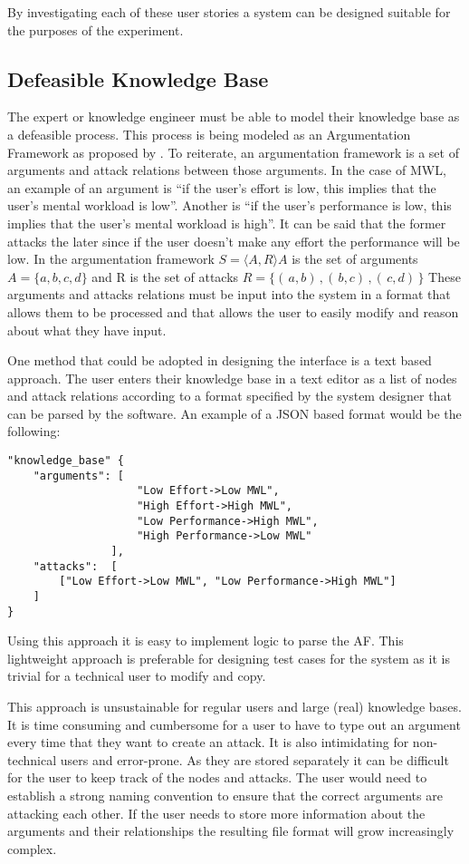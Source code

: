 By investigating each of these user stories a system can be designed suitable for the purposes of the experiment.

\subsection{Defeasible Knowledge Base}
\label{sec:def_kb}
The expert or knowledge engineer must be able to model their knowledge base as a defeasible process. This process is being modeled as an Argumentation Framework as proposed by \cite{dung1995acceptability}. To reiterate, an argumentation framework is a set of arguments and attack relations between those arguments. In the case of MWL, an example of an argument is ``if the user's effort is low, this implies that the user's mental workload is low''. Another is ``if the user's performance is low, this implies that the user's mental workload is high''. It can be said that the former attacks the later since if the user doesn't make any effort the performance will be low. In the argumentation framework $S = \langle A , R \rangle A$ is the set of arguments $A = \{ a , b , c , d \}$ and R is the set of attacks $R = \{ (\, a , b )\, , (\, b , c )\, , (\, c , d )\, \}$  These arguments and attacks relations must be input into the system in a format that allows them to be processed and that allows the user to easily modify and reason about what they have input.

One method that could be adopted in designing the interface is a text based approach. The user enters their knowledge base in a text editor as a list of nodes and attack relations according to a format specified by the system designer that can be parsed by the software. An example of a JSON based format would be the following:

\begin{lstlisting}
"knowledge_base" {
    "arguments": [
                    "Low Effort->Low MWL", 
                    "High Effort->High MWL", 
                    "Low Performance->High MWL", 
                    "High Performance->Low MWL"
                ],
    "attacks":  [
        ["Low Effort->Low MWL", "Low Performance->High MWL"]
    ]
}
\end{lstlisting}

Using this approach it is easy to implement logic to parse the AF. This lightweight approach is preferable for designing test cases for the system as it is trivial for a technical user to modify and copy. 

This approach is unsustainable for regular users and large (real) knowledge bases. It is time consuming and cumbersome for a user to have to type out an argument every time that they want to create an attack. It is also intimidating for non-technical users and error-prone. As they are stored separately it can be difficult for the user to keep track of the nodes and attacks. The user would need to establish a strong naming convention to ensure that the correct arguments are attacking each other. If the user needs to store more information about the arguments and their relationships the resulting file format will grow increasingly complex.

